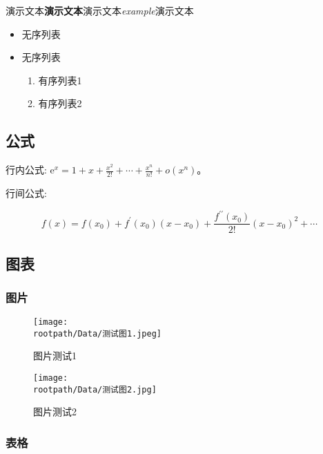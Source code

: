 \documentclass[UTF8]{ctexart}
\newcommand{\rootpath}{..}
\begin{document}
演示文本\textbf{演示文本}演示文本\emph{example}演示文本

\begin{itemize}
\item 无序列表

\item 无序列表

\begin{enumerate}
\item 有序列表1

\item 有序列表2

\end{enumerate}

\end{itemize}

\subsection{公式}

行内公式: $\mathrm{e}^{x}=1+x+\frac{x^{2}}{2 !}+\cdots+\frac{x^{n}}{n !}+o\left(x^{n}\right)$。

行间公式:

\begin{equation}
f(x)=f\left(x_{0}\right)+f^{\prime}\left(x_{0}\right)\left(x-x_{0}\right)+\frac{f^{\prime \prime}\left(x_{0}\right)}{2 !}\left(x-x_{0}\right)^{2}+\cdots
\end{equation}

\subsection{图表}

\subsubsection{图片}


\begin{figure}[H]
    \centering
    \texttt{[image: \\rootpath/Data/测试图1.jpeg]}
    \caption{图片测试1}
    \label{图片测试1}
\end{figure}



\begin{figure}[H]
    \centering
    \texttt{[image: \\rootpath/Data/测试图2.jpg]}
    \caption{图片测试2}
    \label{图片测试2}
\end{figure}


\subsubsection{表格}
\end{document}
